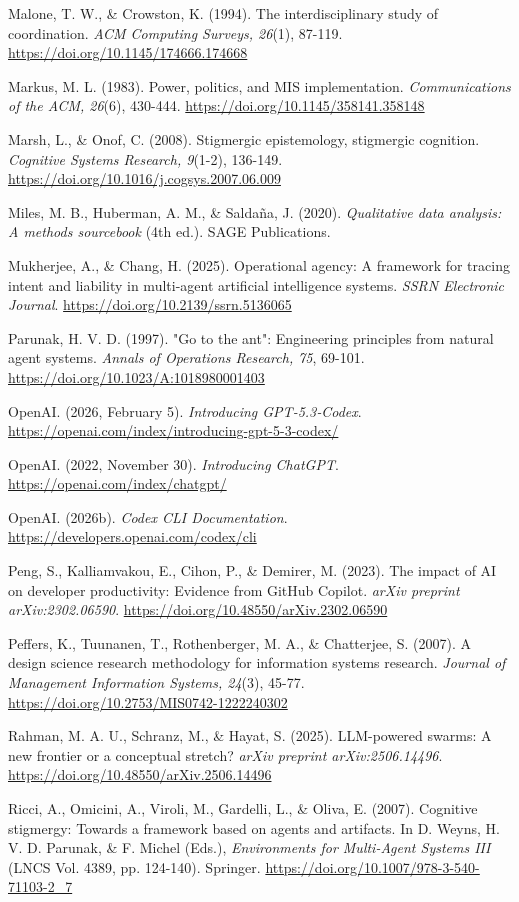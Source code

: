 Malone, T. W., \& Crowston, K. (1994). The interdisciplinary study of
coordination. \emph{ACM Computing Surveys, 26}(1), 87-119.
\url{https://doi.org/10.1145/174666.174668}

Markus, M. L. (1983). Power, politics, and MIS implementation.
\emph{Communications of the ACM, 26}(6), 430-444.
\url{https://doi.org/10.1145/358141.358148}

Marsh, L., \& Onof, C. (2008). Stigmergic epistemology, stigmergic
cognition. \emph{Cognitive Systems Research, 9}(1-2), 136-149.
\url{https://doi.org/10.1016/j.cogsys.2007.06.009}

Miles, M. B., Huberman, A. M., \& Saldaña, J. (2020). \emph{Qualitative
data analysis: A methods sourcebook} (4th ed.). SAGE Publications.

Mukherjee, A., \& Chang, H. (2025). Operational agency: A framework for
tracing intent and liability in multi-agent artificial intelligence
systems. \emph{SSRN Electronic Journal}.
\url{https://doi.org/10.2139/ssrn.5136065}

Parunak, H. V. D. (1997). "Go to the ant": Engineering principles from
natural agent systems. \emph{Annals of Operations Research, 75}, 69-101.
\url{https://doi.org/10.1023/A:1018980001403}

OpenAI. (2026, February 5). \emph{Introducing GPT‑5.3‑Codex}.
\url{https://openai.com/index/introducing-gpt-5-3-codex/}

OpenAI. (2022, November 30). \emph{Introducing ChatGPT}.
\url{https://openai.com/index/chatgpt/}

OpenAI. (2026b). \emph{Codex CLI Documentation}.
\url{https://developers.openai.com/codex/cli}

Peng, S., Kalliamvakou, E., Cihon, P., \& Demirer, M. (2023). The impact
of AI on developer productivity: Evidence from GitHub Copilot.
\emph{arXiv preprint arXiv:2302.06590}.
\url{https://doi.org/10.48550/arXiv.2302.06590}

Peffers, K., Tuunanen, T., Rothenberger, M. A., \& Chatterjee, S.
(2007). A design science research methodology for information systems
research. \emph{Journal of Management Information Systems, 24}(3),
45-77. \url{https://doi.org/10.2753/MIS0742-1222240302}

Rahman, M. A. U., Schranz, M., \& Hayat, S. (2025). LLM-powered swarms:
A new frontier or a conceptual stretch? \emph{arXiv preprint
arXiv:2506.14496}. \url{https://doi.org/10.48550/arXiv.2506.14496}

Ricci, A., Omicini, A., Viroli, M., Gardelli, L., \& Oliva, E. (2007).
Cognitive stigmergy: Towards a framework based on agents and artifacts.
In D. Weyns, H. V. D. Parunak, \& F. Michel (Eds.), \emph{Environments
for Multi-Agent Systems III} (LNCS Vol. 4389, pp. 124-140). Springer.
\url{https://doi.org/10.1007/978-3-540-71103-2_7}

